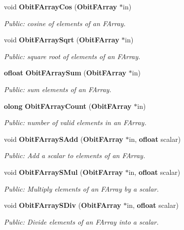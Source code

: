 \begin{CompactItemize}
void {\bf Obit\-FArray\-Cos} ({\bf Obit\-FArray} $\ast$in)
\begin{CompactList}\small\item\em Public: cosine of elements of an FArray. \item\end{CompactList}\item 
void {\bf Obit\-FArray\-Sqrt} ({\bf Obit\-FArray} $\ast$in)
\begin{CompactList}\small\item\em Public: square root of elements of an FArray. \item\end{CompactList}\item 
{\bf ofloat} {\bf Obit\-FArray\-Sum} ({\bf Obit\-FArray} $\ast$in)
\begin{CompactList}\small\item\em Public: sum elements of an FArray. \item\end{CompactList}\item 
{\bf olong} {\bf Obit\-FArray\-Count} ({\bf Obit\-FArray} $\ast$in)
\begin{CompactList}\small\item\em Public: number of valid elements in an FArray. \item\end{CompactList}\item 
void {\bf Obit\-FArray\-SAdd} ({\bf Obit\-FArray} $\ast$in, {\bf ofloat} scalar)
\begin{CompactList}\small\item\em Public: Add a scalar to elements of an FArray. \item\end{CompactList}\item 
void {\bf Obit\-FArray\-SMul} ({\bf Obit\-FArray} $\ast$in, {\bf ofloat} scalar)
\begin{CompactList}\small\item\em Public: Multiply elements of an FArray by a scalar. \item\end{CompactList}\item 
void {\bf Obit\-FArray\-SDiv} ({\bf Obit\-FArray} $\ast$in, {\bf ofloat} scalar)
\begin{CompactList}\small\item\em Public: Divide elements of an FArray into a scalar. \item\end{CompactList}\item 

\end{CompactItemize}
